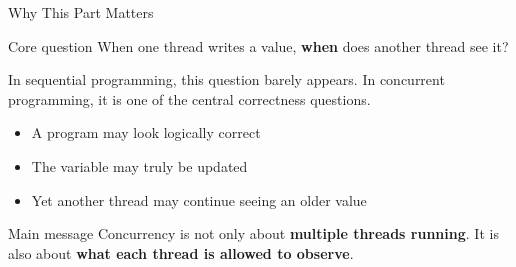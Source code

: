\documentclass[aspectratio=169,11pt]{beamer}
\begin{document}
	\begin{frame}{Why This Part Matters}
		\begin{block}{Core question}
			When one thread writes a value, \textbf{when} does another thread see it?
		\end{block}
		
		\vspace{0.3cm}
		
		In sequential programming, this question barely appears.  
		In concurrent programming, it is one of the central correctness questions.
		
		\vspace{0.3cm}
		
		\begin{itemize}
			\item A program may look logically correct
			\item The variable may truly be updated
			\item Yet another thread may continue seeing an older value
		\end{itemize}
		
		\vspace{0.3cm}
		
		\begin{alertblock}{Main message}
			Concurrency is not only about \textbf{multiple threads running}.  
			It is also about \textbf{what each thread is allowed to observe}.
		\end{alertblock}
	\end{frame}
	
\end{document}
